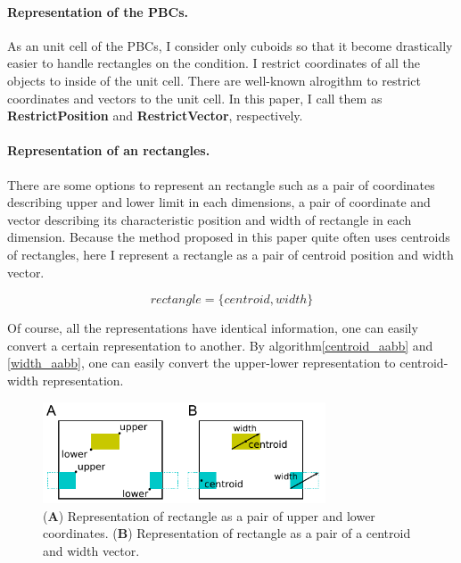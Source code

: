 \documentclass[10pt,letterpaper,twocolumn]{article}
\begin{document}
\paragraph{Representation of the PBCs.}
As an unit cell of the PBCs, I consider only cuboids so that it become
drastically easier to handle rectangles on the condition.
I restrict coordinates of all the objects to inside of the unit cell.
There are well-known alrogithm to restrict coordinates and vectors to the unit
cell. In this paper, I call them as \textbf{RestrictPosition} and
\textbf{RestrictVector}, respectively.

\paragraph{Representation of an rectangles.}
There are some options to represent an rectangle such as a pair of coordinates
describing upper and lower limit in each dimensions, a pair of coordinate and
vector describing its characteristic position and width of rectangle in each
dimension. Because the method proposed in this paper quite often uses centroids
of rectangles, here I represent a rectangle as a pair of centroid position and
width vector.

\begin{equation}
    rectangle = \{centroid, width\}
\end{equation}

Of course, all the representations have identical information, one can easily
convert a certain representation to another. By algorithm\ref{centroid_aabb} and
\ref{width_aabb}, one can easily convert the upper-lower representation to
centroid-width representation.

\begin{figure}[hbt]
    \includegraphics[width=8.4cm, bb=3 2 233 83]{fig3.eps}
    \caption{
    (\textbf{A})
    Representation of rectangle as a pair of upper and lower coordinates.
    (\textbf{B})
    Representation of rectangle as a pair of a centroid and width vector.
    }
    \label{fig-rectangle-rep}
\end{figure}
\end{document}
